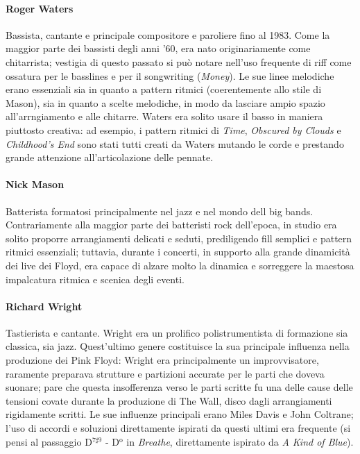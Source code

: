 \documentclass[class=book, crop=false, oneside, 12pt]{standalone}
\begin{document}
    \paragraph{Roger Waters}
    Bassista, cantante e principale compositore e paroliere fino al 1983. Come la maggior parte dei bassisti degli anni '60, era nato originariamente come chitarrista; vestigia di questo passato si può notare nell'uso frequente di riff come ossatura per le basslines e per il songwriting (\emph{Money}). Le sue linee melodiche erano essenziali sia in quanto a pattern ritmici (coerentemente allo stile di Mason), sia in quanto a scelte melodiche, in modo da lasciare ampio spazio all'arrngiamento e alle chitarre. Waters era solito usare il basso in maniera piuttosto creativa: ad esempio, i pattern ritmici di \emph{Time}, \emph{Obscured by Clouds} e \emph{Childhood's End} sono stati tutti creati da Waters mutando le corde e prestando grande attenzione all'articolazione delle pennate.
    \paragraph{Nick Mason}
    Batterista formatosi principalmente nel jazz e nel mondo dell big bands. Contrariamente alla maggior parte dei batteristi rock dell'epoca, in studio era solito proporre arrangiamenti delicati e seduti, prediligendo fill semplici e pattern ritmici essenziali; tuttavia, durante i concerti, in supporto alla grande dinamicità dei live dei Floyd, era capace di alzare molto la dinamica e sorreggere la maestosa impalcatura ritmica e scenica degli eventi.
    \paragraph{Richard Wright}
    Tastierista e cantante. Wright era un prolifico polistrumentista di formazione sia classica, sia jazz. Quest'ultimo genere costituisce la sua principale influenza nella produzione dei Pink Floyd: Wright era principalmente un improvvisatore, raramente preparava strutture e partizioni accurate per le parti che doveva suonare; pare che questa insofferenza verso le parti scritte fu una delle cause delle tensioni covate durante la produzione di The Wall, disco dagli arrangiamenti rigidamente scritti. Le sue influenze principali erano Miles Davis e John Coltrane; l'uso di accordi e soluzioni direttamente ispirati da questi ultimi era frequente (si pensi al passaggio D\(^{7 \sharp 9}\) - D\(^\textrm{o}\) in \emph{Breathe}, direttamente ispirato da \emph{A Kind of Blue}). 
\end{document}
